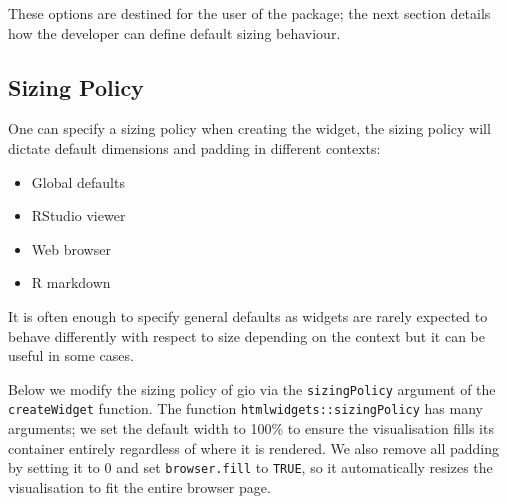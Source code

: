 \documentclass[10pt,]{krantz}
\makeatletter
\newenvironment{Shaded}{\begin{snugshade}}{\end{snugshade}}
\newcommand{\CommentTok}[1]{\textcolor[rgb]{0.37,0.37,0.37}{\textit{#1}}}
\newcommand{\DataTypeTok}[1]{\textcolor[rgb]{0.27,0.27,0.27}{#1}}
\newcommand{\DecValTok}[1]{\textcolor[rgb]{0.06,0.06,0.06}{#1}}
\newcommand{\KeywordTok}[1]{\textcolor[rgb]{0.27,0.27,0.27}{\textbf{#1}}}
\newcommand{\NormalTok}[1]{#1}
\newcommand{\OperatorTok}[1]{\textcolor[rgb]{0.43,0.43,0.43}{\textbf{#1}}}
\newcommand{\OtherTok}[1]{\textcolor[rgb]{0.37,0.37,0.37}{#1}}
\newcommand{\StringTok}[1]{\textcolor[rgb]{0.5,0.5,0.5}{#1}}
\providecommand{\tightlist}{%
  \setlength{\itemsep}{0pt}\setlength{\parskip}{0pt}}
\newenvironment{kframe}{%
\medskip{}
\setlength{\fboxsep}{.8em}
 \def\at@end@of@kframe{}%
 \ifinner\ifhmode%
  \def\at@end@of@kframe{\end{minipage}}%
  \begin{minipage}{\columnwidth}%
 \fi\fi%
 \def\FrameCommand##1{\hskip\@totalleftmargin \hskip-\fboxsep
 \colorbox{shadecolor}{##1}\hskip-\fboxsep
     \hskip-\linewidth \hskip-\@totalleftmargin \hskip\columnwidth}%
 \MakeFramed {\advance\hsize-\width
   \@totalleftmargin\z@ \linewidth\hsize
   \@setminipage}}%
 {\par\unskip\endMakeFramed%
 \at@end@of@kframe}
\renewenvironment{Shaded}{\begin{kframe}}{\end{kframe}}
\makeatother
\begin{document}
These options are destined for the user of the package; the next section details how the developer can define default sizing behaviour.

\hypertarget{widgets-adv-sizing-policy}{%
\subsection{Sizing Policy}\label{widgets-adv-sizing-policy}}

One can specify a sizing policy when creating the widget, the sizing policy will dictate default dimensions and padding in different contexts:

\begin{itemize}
\tightlist
\item
  Global defaults
\item
  RStudio viewer
\item
  Web browser
\item
  R markdown
\end{itemize}

It is often enough to specify general defaults as widgets are rarely expected to behave differently with respect to size depending on the context but it can be useful in some cases.

Below we modify the sizing policy of gio via the \texttt{sizingPolicy} argument of the \texttt{createWidget} function. The function \texttt{htmlwidgets::sizingPolicy} has many arguments; we set the default width to 100\% to ensure the visualisation fills its container entirely regardless of where it is rendered. We also remove all padding by setting it to 0 and set \texttt{browser.fill} to \texttt{TRUE}, so it automatically resizes the visualisation to fit the entire browser page.

\begin{Shaded}
\end{Shaded}
\end{document}
